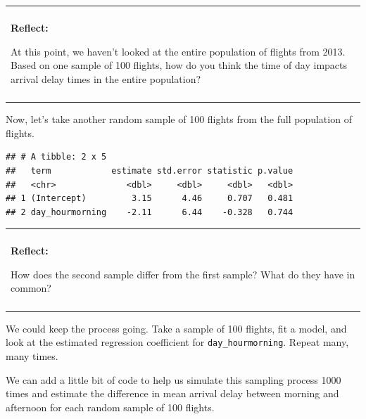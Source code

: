 \documentclass[
]{book}
\newenvironment{Shaded}{\begin{snugshade}}{\end{snugshade}}
\newcommand{\CommentTok}[1]{\textcolor[rgb]{0.56,0.35,0.01}{\textit{#1}}}
\newcommand{\DataTypeTok}[1]{\textcolor[rgb]{0.13,0.29,0.53}{#1}}
\newcommand{\DecValTok}[1]{\textcolor[rgb]{0.00,0.00,0.81}{#1}}
\newcommand{\KeywordTok}[1]{\textcolor[rgb]{0.13,0.29,0.53}{\textbf{#1}}}
\newcommand{\NormalTok}[1]{#1}
\newcommand{\OperatorTok}[1]{\textcolor[rgb]{0.81,0.36,0.00}{\textbf{#1}}}
\newcommand{\StringTok}[1]{\textcolor[rgb]{0.31,0.60,0.02}{#1}}
\newenvironment{reflect}
{
    \begin{center}
    
    \begin{tabular}{|p{0.8\textwidth}|}
    \rowcolor{LightBlue}
    \hline\\
    \rowcolor{LightBlue}
    \textbf{Reflect:}
}
{
    \\\rowcolor{LightBlue}
    \\\hline
    \end{tabular} 
    \end{center}
}
\begin{document}
\begin{reflect}
At this point, we haven't looked at the entire population of flights
from 2013. Based on one sample of 100 flights, how do you think the time
of day impacts arrival delay times in the entire population?
\end{reflect}

Now, let's take another random sample of 100 flights from the full population of flights.

\begin{Shaded}
\end{Shaded}

\begin{verbatim}
## # A tibble: 2 x 5
##   term            estimate std.error statistic p.value
##   <chr>              <dbl>     <dbl>     <dbl>   <dbl>
## 1 (Intercept)         3.15      4.46     0.707   0.481
## 2 day_hourmorning    -2.11      6.44    -0.328   0.744
\end{verbatim}

\begin{reflect}
How does the second sample differ from the first sample? What do they
have in common?
\end{reflect}

We could keep the process going. Take a sample of 100 flights, fit a model, and look at the estimated regression coefficient for \texttt{day\_hourmorning}. Repeat many, many times.

We can add a little bit of code to help us simulate this sampling process 1000 times and estimate the difference in mean arrival delay between morning and afternoon for each random sample of 100 flights.

\begin{Shaded}
\end{Shaded}
\end{document}
